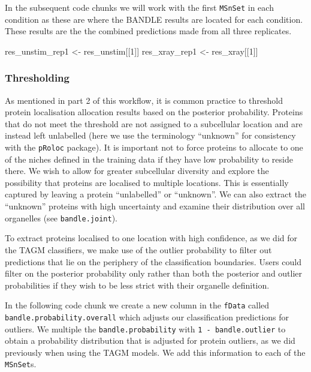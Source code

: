 \documentclass[9pt,a4paper,]{extarticle}
\newenvironment{Shaded}{\begin{snugshade}}{\end{snugshade}}
\newcommand{\DecValTok}[1]{\textcolor[rgb]{0.00,0.00,0.81}{#1}}
\newcommand{\NormalTok}[1]{#1}
\newcommand{\OtherTok}[1]{\textcolor[rgb]{0.56,0.35,0.01}{#1}}
\begin{document}
In the subsequent code chunks we will work with the first \texttt{MSnSet} in each
condition as these are where the BANDLE results are located for each condition.
These results are the the combined predictions made from all three replicates.

\begin{Shaded}
\begin{Highlighting}[]
\NormalTok{res\_unstim\_rep1 }\OtherTok{\textless{}{-}}\NormalTok{ res\_unstim[[}\DecValTok{1}\NormalTok{]]}
\NormalTok{res\_xray\_rep1 }\OtherTok{\textless{}{-}}\NormalTok{ res\_xray[[}\DecValTok{1}\NormalTok{]]}
\end{Highlighting}
\end{Shaded}

\subsubsection{Thresholding}\label{thresholding}

As mentioned in part 2 of this workflow, it is common practice to threshold protein
localisation allocation results based on the posterior probability. Proteins
that do not meet the threshold are not assigned to a subcellular location and
are instead left unlabelled (here we use the terminology ``unknown'' for consistency
with the \texttt{pRoloc} package). It is important not to force proteins to allocate to
one of the niches defined in the training data if they have low probability to
reside there. We wish to allow for greater subcellular diversity and explore the
possibility that proteins are localised to multiple locations. This is essentially
captured by leaving a protein ``unlabelled'' or ``unknown''. We can also extract
the ``unknown'' proteins with high uncertainty and examine their distribution over
all organelles (see \texttt{bandle.joint}).

To extract proteins localised to one location with high confidence, as we did
for the TAGM classifiers, we make use of the outlier probability to filter out
predictions that lie on the periphery of the classification boundaries. Users
could filter on the posterior probability only rather than both the
posterior and outlier probabilities if they wish to be less strict with their
organelle definition.

In the following code chunk we create a new column in the \texttt{fData} called
\texttt{bandle.probability.overall} which adjusts our classification predictions for
outliers. We multiple the \texttt{bandle.probability} with \texttt{1\ -\ bandle.outlier} to
obtain a probability distribution that is adjusted for protein outliers, as we
did previously when using the TAGM models. We add this information to each of
the \texttt{MSnSet}s.
\end{document}

